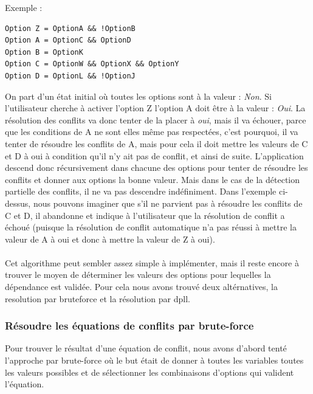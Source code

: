\documentclass[16pts]{report}
\begin{document}
Exemple :\\
\begin{lstlisting}
Option Z = OptionA && !OptionB
Option A = OptionC && OptionD
Option B = OptionK
Option C = OptionW && OptionX && OptionY
Option D = OptionL && !OptionJ
\end{lstlisting}

On part d'un état initial où toutes les options sont à la valeur :
\textit{Non}.  Si l'utilisateur cherche à activer l'option Z l'option A doit
être à la valeur : \textit{Oui}. La résolution des conflits va donc tenter de
la placer à \textit{oui}, mais il va échouer, parce que les conditions de A ne sont elles
même pas respectées, c'est pourquoi, il va tenter de résoudre les conflits de A, mais
pour cela il doit mettre les valeurs de C et D à oui à condition qu'il n'y ait
pas de conflit, et ainsi de suite.  L'application descend donc récursivement dans chacune
des options pour tenter de résoudre les conflits et donner aux options la bonne
valeur. Mais dans le cas de la détection partielle des conflits, il ne va pas
descendre indéfiniment. Dans l'exemple ci-dessus, nous pouvons imaginer que
s'il ne parvient pas à résoudre les conflits de C et D, il abandonne et
indique à l'utilisateur que la résolution de conflit a échoué (puisque la
résolution de conflit automatique n'a pas réussi à mettre la valeur de A à oui
et donc à mettre la valeur de Z à oui).\\
\\

Cet algorithme peut sembler assez simple à implémenter, mais il reste encore
à trouver le moyen de déterminer les valeurs des options pour lequelles la
dépendance est validée. Pour cela nous avons trouvé deux altérnatives, la
resolution par bruteforce et la résolution par dpll.


            \subsubsection{Résoudre les équations de conflits par brute-force}
            \label{sub:Résoudre les équations de conflits par brute-force}

Pour trouver le résultat d'une équation de conflit, nous avons d'abord tenté
l'approche par brute-force où le but était de donner à toutes les variables
toutes les valeurs possibles et de sélectionner les combinaisons d'options qui
valident l'équation.
\\
\end{document}
